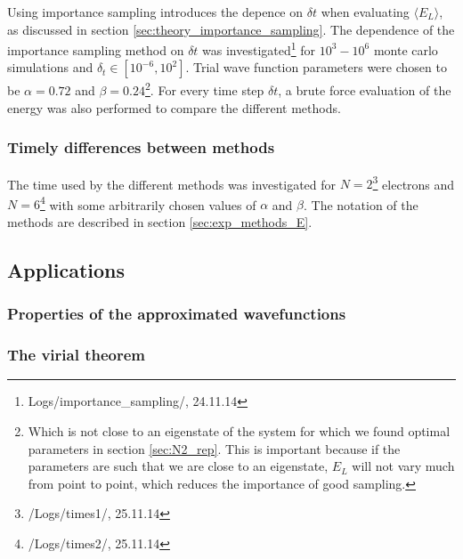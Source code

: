 Using importance sampling introduces the depence on $\delta t$ when evaluating $\langle E_L \rangle$, as discussed in section \ref{sec:theory_importance_sampling}.
The dependence of the importance sampling method on $\delta t$ was investigated\footnote{Logs/importance\_sampling/, 24.11.14} 
for $10^3 - 10^6$ monte carlo simulations and $\delta_t \in [10^{-6}, 10^2]$. 
Trial wave function parameters were chosen to be $\alpha = 0.72$ and $\beta = 0.24$\footnote{Which is not close to an eigenstate of the system for which we found optimal parameters in section \ref{sec:N2_rep}. This is important because if the parameters are such that we are close to an eigenstate, $E_L$ will not vary much from point to point, which reduces the importance of good sampling.}.
For every time step $\delta t$, a brute force evaluation of the energy was also performed to compare the different methods. 


\subsubsection{Timely differences between methods}

The time used by the different methods was investigated for $N=2$\footnote{/Logs/times1/, 25.11.14} electrons and 
$N=6$\footnote{/Logs/times2/, 25.11.14} with some arbitrarily chosen values of $\alpha$ and $\beta$. 
The notation of the methods are described in section \ref{sec:exp_methods_E}. 


















\subsection{Applications}

\subsubsection{Properties of the approximated wavefunctions}

\subsubsection{The virial theorem }